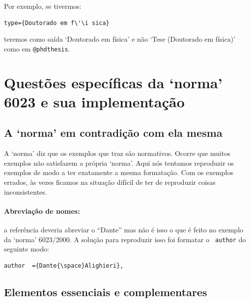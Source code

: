 \documentclass[a4paper]{ltxdoc}
\begin{document}
Por exemplo, se tivermos:

\begin{verbatim}
type={Doutorado em f\'\i sica}
\end{verbatim}

teremos como saída `Doutorado em física' e não `Tese (Doutorado em física)' como
em \texttt{@phdthesis}.




\appendix

\section{Questões específicas da `norma' 6023 e sua implementação}

\subsection{A `norma' em contradição com ela mesma}

A `norma' diz que os exemplos que traz são normativos. Ocorre que muitos
exemplos não satisfazem a própria `norma'. Aqui nós tentamos reproduzir os
exemplos de modo a ter exatamente a mesma formatação. Com os exemplos errados,
às vezes ficamos na situação difícil de ter de reproduzir coisas inconsistentes.

\paragraph{Abreviação de nomes:} a referência  deveria
abreviar o ``Dante'' mas não é isso o que é feito no exemplo da `norma'
6023/2000\cite{NBR6023:2000}. A solução para reproduzir isso foi formatar o \texttt{
author} do seguinte modo:

\begin{verbatim}
author  ={Dante{\space}Alighieri},
\end{verbatim}

\subsection{Elementos essenciais e complementares}
\end{document}
